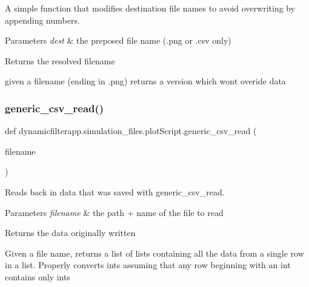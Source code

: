 A simple function that modifies destination file names to avoid overwriting by appending numbers. 


\begin{DoxyParams}{Parameters}
{\em dest} & the preposed file name (.png or .csv only) \\
\hline
\end{DoxyParams}
\begin{DoxyReturn}{Returns}
the resolved filename \begin{DoxyVerb}given a filename (ending in .png) returns a version which wont overide data
\end{DoxyVerb}
 
\end{DoxyReturn}
\mbox{\label{namespacedynamicfilterapp_1_1simulation__files_1_1plot_script_a471203f34a5e5a8da0a8dae81ef6ddc7}} 
\subsubsection{\texorpdfstring{generic\+\_\+csv\+\_\+read()}{generic\_csv\_read()}}
{\footnotesize\ttfamily def dynamicfilterapp.\+simulation\+\_\+files.\+plot\+Script.\+generic\+\_\+csv\+\_\+read (\begin{DoxyParamCaption}\item[{}]{filename }\end{DoxyParamCaption})}



Reads back in data that was saved with generic\+\_\+csv\+\_\+read. 


\begin{DoxyParams}{Parameters}
{\em filename} & the path + name of the file to read \\
\hline
\end{DoxyParams}
\begin{DoxyReturn}{Returns}
the data originally written \begin{DoxyVerb}Given a file name, returns a list of lists containing all the data from a
single row in a list. Properly converts ints assuming that any row beginning
with an int contains only ints
\end{DoxyVerb}
 
\end{DoxyReturn}
\mbox{\label{namespacedynamicfilterapp_1_1simulation__files_1_1plot_script_afc50b7236c9fe752b68c9fe393c26230}} 
